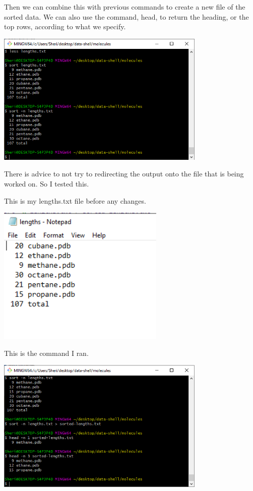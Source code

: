 \documentclass{article}
\begin{document}
Then we can combine this with previous commands to create a new file of the sorted data. We can also use the command, head, to return the heading, or the top rows, according to what we specify.

\includegraphics[width=10cm]{Images/GitBash_032.PNG}

There is advice to not try to redirecting the output onto the file that is being worked on. So I tested this. 

This is my lengths.txt file before any changes.

\includegraphics[width=8cm]{Images/GitBash_034a.PNG}

This is the command I ran.

\includegraphics[width=10cm]{Images/GitBash_033.PNG}
\end{document}
